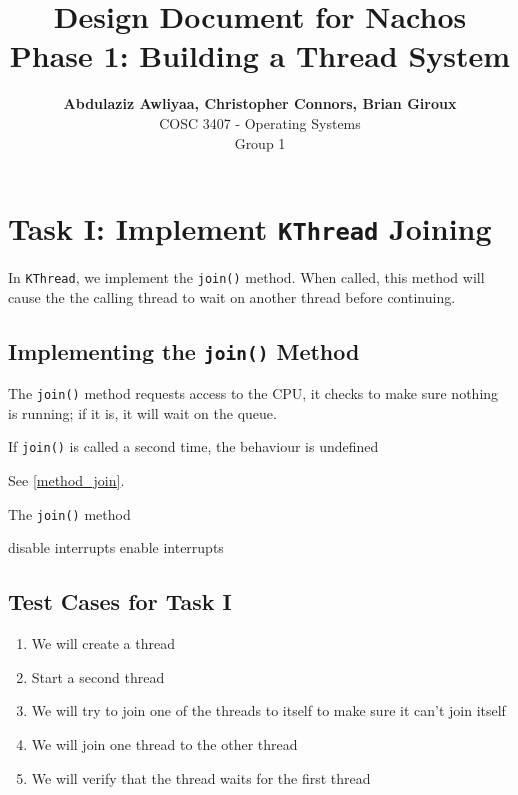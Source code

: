 \documentclass[12pt, letterpaper]{report}
\newcommand{\code}[1]{\texttt{#1}}
\begin{document}
\title{Design Document for Nachos \\
       Phase 1: Building a Thread System}
\author{\textbf{Abdulaziz Awliyaa, 
        Christopher Connors,
        Brian Giroux} \\
        COSC 3407 - Operating Systems \\
        Group 1}
\maketitle

\section*{Task I: Implement \code{KThread} Joining}

In \code{KThread}, we implement the \code{join()} method. When called, this method will cause the the calling thread to wait on another thread before continuing.

\subsection*{Implementing the \code{join()} Method}

The \code{join()} method requests access to the CPU, it checks to make sure nothing is running; if it is, it will wait on the queue.

If \code{join()} is called a second time, the behaviour is undefined

See \vref{method_join}.

\begin{algorithm}[!ht]
  \caption{The \code{join()} method}
  \label{method_join}
    \SetAlgoLined
    disable interrupts\;
    enable interrupts\;
\end{algorithm}


\subsection*{Test Cases for Task I}

\begin{enumerate}
\item We will create a thread
\item Start a second thread
\item We will try to join one of the threads to itself to make sure it can't join itself
\item We will join one thread to the other thread
\item We will verify that the thread waits for the first thread
\end{enumerate}
\end{document}
